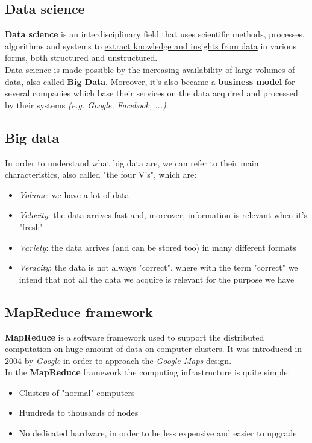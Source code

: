 \subsection{Data science}
\textbf{Data science} is an interdisciplinary field that uses scientific methods, processes, algorithms and systems to \underline{extract knowledge and insights from data} in various forms, both structured and unstructured.\\
Data science is made possible by the increasing availability of large volumes of data, also called \textbf{Big Data}. Moreover, it's also became a \textbf{business model} for several companies which base their services on the data acquired and processed by their systems \textit{(e.g. Google, Facebook, ...)}.

\subsection{Big data}
In order to understand what big data are, we can refer to their main characteristics, also called "the four V's", which are:
\begin{itemize}
    \item \textit{Volume}: we have a lot of data
    \item \textit{Velocity}: the data arrives fast and, moreover, information is relevant when it's "fresh"
    \item \textit{Variety}: the data arrives (and can be stored too) in many different formats
    \item \textit{Veracity}: the data is not always "correct", where with the term "correct" we intend that not all the data we acquire is relevant for the purpose we have
\end{itemize}

\subsection{MapReduce framework}
\textbf{MapReduce} is a software framework used to support the distributed computation on huge amount of data on computer clusters. It was introduced in 2004 by \textit{Google} in order to approach the \textit{Google Maps} design.\\
In the \textbf{MapReduce} framework the computing infrastructure is quite simple:
\begin{itemize}
    \item Clusters of "normal" computers
    \item Hundreds to thousands of nodes
    \item No dedicated hardware, in order to be less expensive and easier to upgrade
\end{itemize}

